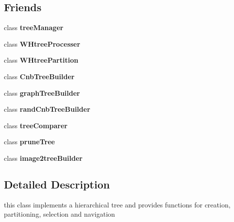 \subsection*{\-Friends}
\begin{DoxyCompactItemize}
\item 
\hypertarget{classWHtree_af72597ee1ec830f8baed4cf6530de2bb}{class {\bfseries tree\-Manager}}\label{classWHtree_af72597ee1ec830f8baed4cf6530de2bb}

\item 
\hypertarget{classWHtree_aa026eb4bf2b88a9c96a9f61becc4bc75}{class {\bfseries \-W\-Htree\-Processer}}\label{classWHtree_aa026eb4bf2b88a9c96a9f61becc4bc75}

\item 
\hypertarget{classWHtree_a76c0766ec0d11631be2a5536cb438e3b}{class {\bfseries \-W\-Htree\-Partition}}\label{classWHtree_a76c0766ec0d11631be2a5536cb438e3b}

\item 
\hypertarget{classWHtree_a6e4f46be3b13b1a3b8e387f92b0745b1}{class {\bfseries \-Cnb\-Tree\-Builder}}\label{classWHtree_a6e4f46be3b13b1a3b8e387f92b0745b1}

\item 
\hypertarget{classWHtree_a2b9669f74a8c5a48d2ab80e8b7dfcd30}{class {\bfseries graph\-Tree\-Builder}}\label{classWHtree_a2b9669f74a8c5a48d2ab80e8b7dfcd30}

\item 
\hypertarget{classWHtree_aa166ce0e9265255d37c059e22933ad75}{class {\bfseries rand\-Cnb\-Tree\-Builder}}\label{classWHtree_aa166ce0e9265255d37c059e22933ad75}

\item 
\hypertarget{classWHtree_a7a2a00e4f53408139140c80049a0fd7d}{class {\bfseries tree\-Comparer}}\label{classWHtree_a7a2a00e4f53408139140c80049a0fd7d}

\item 
\hypertarget{classWHtree_a56b8e264b4bfff5cc2854c918b1236a8}{class {\bfseries prune\-Tree}}\label{classWHtree_a56b8e264b4bfff5cc2854c918b1236a8}

\item 
\hypertarget{classWHtree_a5fb14ee3a81b09687fbf1fd7ad2cba51}{class {\bfseries image2tree\-Builder}}\label{classWHtree_a5fb14ee3a81b09687fbf1fd7ad2cba51}

\end{DoxyCompactItemize}


\subsection{\-Detailed \-Description}
this class implements a hierarchical tree and provides functions for creation, partitioning, selection and navigation 

